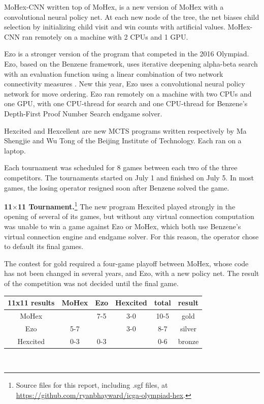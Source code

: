\documentclass{icga}
\def\Eo{\mbox{\sc Ezo}}
\def\Hite{\mbox{\sc Hexcited}}
\def\Hent{\mbox{\sc Hexcellent}}
\def\Mx{\mbox{\sc MoHex}}
\def\Mc{\mbox{\sc MoHex-CNN}}
\begin{document}
\Mc{} 
written top of \Mx{},
is a new version of MoHex with a convolutional neural policy net.
At each new node of the tree, the net biases child selection by
initializing child visit and win counts with artificial values.
\Mc{} ran remotely on a machine with 2 CPUs and 1 GPU.

\Eo{} is a stronger version of the program that competed in the 
2016 Olympiad.
\Eo{}, based on the Benzene framework, 
uses iterative deepening alpha-beta search 
with an evaluation function using a linear combination of
two network connectivity measures .
New this year, \Eo{} uses a convolutional neural policy network
for move ordering.
\Eo{} ran remotely on a machine
with two CPUs and one GPU,
with one CPU-thread for search and one CPU-thread for
Benzene's Depth-First Proof Number Search endgame solver.

\Hite{} and \Hent{} are new MCTS programs written 
respectively by Ma Shengjie and Wu Tong
of the Beijing Institute of Technology.
Each ran on a laptop.

Each tournament was scheduled for 8 games between
each two of the three competitors.
The tournaments started on July 1 and finished on July 5.
In most games, the losing operator resigned
soon after Benzene solved the game.

{\large\bf 11$\times$11 Tournament.}\footnote{Source files for this report, including .sgf files, at \url{https://github.com/ryanbhayward/icga-olympiad-hex}.}
The new program \Hite{} played strongly in the opening of
several of its games,
but without any virtual connection computation was unable
to win a game against \Eo{} or \Mx{}, which both
use Benzene's virtual connection engine and endgame solver.
For this reason, the operator chose to default its final games.

The contest for gold required a four-game playoff between
\Mx{}, whose code has not been changed in several years,
and \Eo{}, with a new policy net.
The result of the competition was not decided until the final game.

\hfill\begin{tabular}{|c|c|c|c|c|c|}
\hline 11x11 results &\Mx{} &\Eo{}  & \Hite{}  & total & result \\ 
\hline \Mx{}         &      &  7-5  &  3-0   & 10-5  &  gold \\
\hline \Eo{}         &  5-7 &       &  3-0   & 8-7   &  silver \\
\hline \Hite{}       &  0-3 &  0-3  &        & 0-6   &  bronze \\
\hline
\end{tabular}\hfill~
\end{document}
